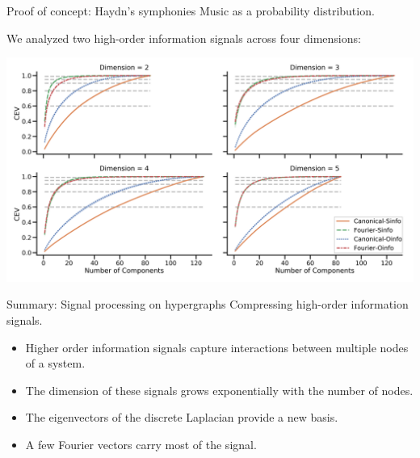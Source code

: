 \begin{frame}{Proof of concept: Haydn's symphonies}
	\pause\vskip -5pt
	Music as a probability distribution.

	\pause\vskip 5pt
	We analyzed two high-order information signals across four dimensions:

	\pause\vskip 7pt
	\hspace*{-15pt}
	\includegraphics[scale=.096]{aux/hyperharmonic}
\end{frame}

\begin{frame}{Summary: Signal processing on hypergraphs}
	 Compressing high-order information signals.

	\pause\medskip
	\begin{itemize}
		\itemsep15pt %
		\item Higher order information signals capture interactions between multiple nodes of a system.

		\item The dimension of these signals grows exponentially with the number of nodes.

		\item The eigenvectors of the discrete Laplacian provide a new basis.

		\item A few Fourier vectors carry most of the signal.
	\end{itemize}
\end{frame}